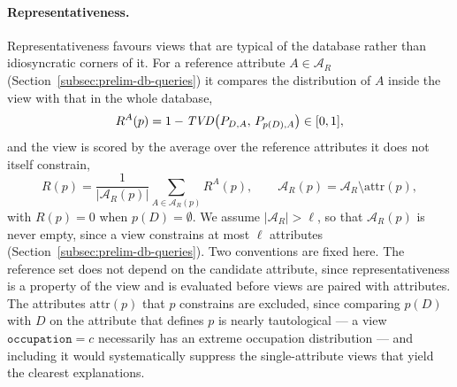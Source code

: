 \paragraph{Representativeness.}
Representativeness favours views that are typical of the database rather than idiosyncratic corners of it.
For a reference attribute $A\in\mathcal{A}_R$ (Section~\ref{subsec:prelim-db-queries}) it compares the distribution of $A$ inside the view with that in the whole database,
\begin{equation}
R^A(p)=1-\mathit{TVD}\!\left(P_{D,A},\,P_{p(D),A}\right)\in[0,1],
\label{eq:ideal-representativeness}
\end{equation}
and the view is scored by the average over the reference attributes it does not itself constrain,
\[
R(p)=\frac{1}{|\mathcal{A}_R(p)|}\sum_{A\in\mathcal{A}_R(p)} R^A(p),
\qquad
\mathcal{A}_R(p)=\mathcal{A}_R\setminus\mathrm{attr}(p),
\]
with $R(p)=0$ when $p(D)=\emptyset$.
We assume $|\mathcal{A}_R|>\ell$, so that $\mathcal{A}_R(p)$ is never empty, since a view constrains at most $\ell$ attributes (Section~\ref{subsec:prelim-db-queries}).
Two conventions are fixed here.
The reference set does not depend on the candidate attribute, since representativeness is a property of the view and is evaluated before views are paired with attributes.
The attributes $\mathrm{attr}(p)$ that $p$ constrains are excluded, since comparing $p(D)$ with $D$ on the attribute that defines $p$ is nearly tautological --- a view $\texttt{occupation}=c$ necessarily has an extreme occupation distribution --- and including it would systematically suppress the single-attribute views that yield the clearest explanations.

